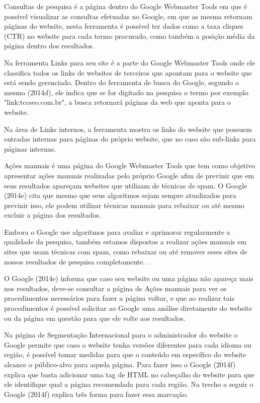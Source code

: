 \documentclass[
	12pt,				%
	openright,			%
	twoside,			%
	a4paper,			%
	english,			%
	french,				%
	spanish,			%
	brazil				%
	]{abntex2}
\begin{document}
Consultas de pesquisa é a página dentro do Google Webmaster Tools em que é possível visualizar as consultas efetuadas no Google, em que as mesma retornam páginas do website, nesta ferramenta é possível ter dados como a taxa cliques (CTR) no website para cada termo procurado, como também a posição média da página dentro dos resultados.

Na ferramenta Links para seu site é a parte do Google Webmaster Tools onde ele classifica todos os links de websites de terceiros que apontam para o website que está sendo gerenciado. Dentro do ferramenta de busca do Google, segundo o mesmo (2014d), ele indica que se for digitado na pesquisa o termo por exemplo "link:tccseo.com.br", a busca retornará páginas da web que aponta para o website.

Na área de Links internos, a ferramenta mostra os links do website que possuem entradas internas para páginas do próprio website, que no caso são sub-links para páginas internas.

Ações manuais é uma página do Google Webmaster Tools que tem como objetivo apresentar ações manuais realizadas pelo próprio Google afim de previnir que em seus resultados apareçam websites que utilizam de técnicas de spam. O Google (2014e) cita que mesmo que seus algoritmos sejam sempre atualizados para previnir isso, ele podem utilizar técnicas manuais para rebaixar ou até mesmo excluir a página dos resultados.

\begin{citacao}
Embora o Google use algoritmos para avaliar e aprimorar regularmente a qualidade da pesquisa, também estamos dispostos a realizar ações manuais em sites que usam técnicas com spam, como rebaixar ou até remover esses sites de nossos resultados de pesquisa completamente.
\cite[p7]{NBR10520:2002}.
\end{citacao}

O Google (2014e) informa que caso seu website ou uma página não apareça mais nos resultados, deve-se consultar a página de Ações manuais para ver os procedimentos necessários para fazer a página voltar, e que ao realizar tais procedimentos é possível solicitar ao Google uma análise diretamente do website ou da página em questão para que ele volte aos resultados.

Na página de Segmentação Internacional para o administrador do website o Google permite que caso o website tenha versões diferentes para cada idioma ou região, é possível tomar medidas para que o conteúdo em específico do website alcance o público-alvo para aquela página. Para fazer isso o Google (2014f) explica que basta adicionar uma tag de HTML no cabeçalho do website para que ele identifique qual a página recomendada para cada região. Na trecho a seguir o Google (2014f) explica três forma para fazer essa marcação.
\end{document}
